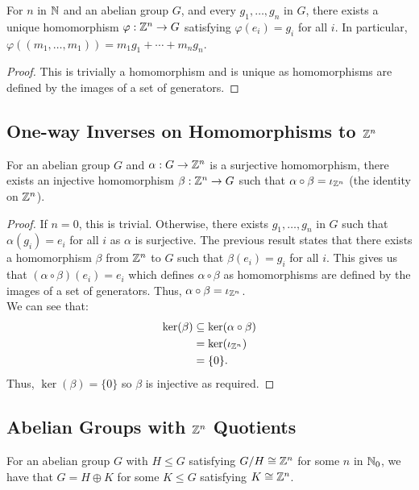 For $n$ in $\mathbb{N}$ and an abelian group $G$, and every $g_1, \ldots, g_n$
in $G$, there exists a unique homomorphism $\varphi : \mathbb{Z}^n \to G$
satisfying $\varphi(e_i) = g_i$ for all $i$. In particular,
$\varphi((m_1, \ldots, m_1)) = m_1g_1 + \cdots + m_ng_n$.

\begin{proof}
    This is trivially a homomorphism and is unique as homomorphisms are 
    defined by the images of a set of generators.
\end{proof}

\subsection{One-way Inverses on Homomorphisms to $\mathbb{Z}^n$}

For an abelian group $G$ and $\alpha : G \to \mathbb{Z}^n$ is a surjective
homomorphism, there exists an injective homomorphism $\beta : \mathbb{Z}^n \to G$
such that $\alpha \circ \beta = \iota_{\mathbb{Z}^n}$ (the identity on $\mathbb{Z}^n$).

\begin{proof}
    If $n = 0$, this is trivial. Otherwise, there exists $g_1, \ldots, g_n$
    in $G$ such that $\alpha(g_i) = e_i$ for all $i$ as $\alpha$ is surjective.
    The previous result states that there exists a homomorphism $\beta$
    from $\mathbb{Z}^n$ to $G$ such that $\beta(e_i) = g_i$ for all $i$.
    This gives us that $(\alpha \circ \beta)(e_i) = e_i$ which defines
    $\alpha \circ \beta$ as homomorphisms are defined by the images of
    a set of generators. Thus, $\alpha \circ \beta = \iota_{\mathbb{Z}^n}$.
    \\[\baselineskip]
    We can see that: \begin{align*}
        \ker(\beta) &\subseteq \ker(\alpha \circ \beta) \\
        &= \ker(\iota_{\mathbb{Z}^n}) \\
        &= \{0\}.
    \end{align*} Thus, $\ker(\beta) = \{0\}$ so $\beta$ is injective as
    required.
\end{proof}

\subsection{Abelian Groups with $\mathbb{Z}^n$ Quotients}

For an abelian group $G$ with $H \leq G$ satisfying $G/H \cong \mathbb{Z}^n$
for some $n$ in $\mathbb{N}_0$, we have that $G = H \oplus K$ for some $K \leq G$
satisfying $K \cong \mathbb{Z}^n$.

